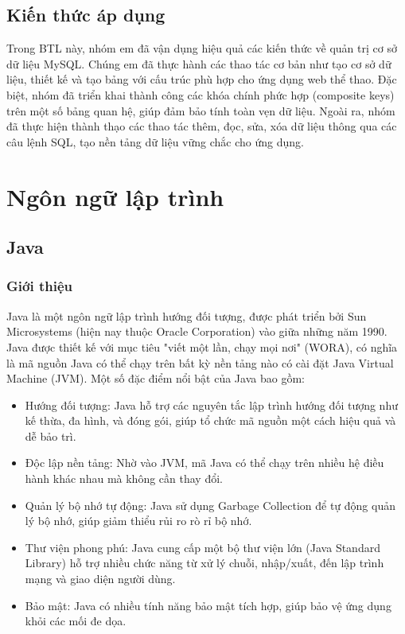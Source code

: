 \documentclass[../BTL.tex]{subfiles}
\begin{document}
\subsection{ Kiến thức áp dụng}
Trong BTL này, nhóm em đã vận dụng hiệu quả các kiến thức về quản trị cơ sở dữ liệu MySQL. Chúng em đã thực hành các thao tác cơ bản như tạo cơ sở dữ liệu, thiết kế và tạo bảng với cấu trúc phù hợp cho ứng dụng web thể thao. Đặc biệt, nhóm đã triển khai thành công các khóa chính phức hợp (composite keys) trên một số bảng quan hệ, giúp đảm bảo tính toàn vẹn dữ liệu. Ngoài ra, nhóm đã thực hiện thành thạo các thao tác thêm, đọc, sửa, xóa dữ liệu thông qua các câu lệnh SQL, tạo nền tảng dữ liệu vững chắc cho ứng dụng.
\section{Ngôn ngữ lập trình}
\subsection{Java}
\subsubsection{Giới thiệu}
Java là một ngôn ngữ lập trình hướng đối tượng, được phát triển bởi Sun Microsystems (hiện nay thuộc Oracle Corporation) vào giữa những năm 1990. Java được thiết kế với mục tiêu "viết một lần, chạy mọi nơi" (WORA), có nghĩa là mã nguồn Java có thể chạy trên bất kỳ nền tảng nào có cài đặt Java Virtual Machine (JVM). Một số đặc điểm nổi bật của Java bao gồm:

\begin{itemize}
    \item Hướng đối tượng: Java hỗ trợ các nguyên tắc lập trình hướng đối tượng như kế thừa, đa hình, và đóng gói, giúp tổ chức mã nguồn một cách hiệu quả và dễ bảo trì.
    \item Độc lập nền tảng: Nhờ vào JVM, mã Java có thể chạy trên nhiều hệ điều hành khác nhau mà không cần thay đổi.
    \item Quản lý bộ nhớ tự động: Java sử dụng Garbage Collection để tự động quản lý bộ nhớ, giúp giảm thiểu rủi ro rò rỉ bộ nhớ.
    \item Thư viện phong phú: Java cung cấp một bộ thư viện lớn (Java Standard Library) hỗ trợ nhiều chức năng từ xử lý chuỗi, nhập/xuất, đến lập trình mạng và giao diện người dùng.
    \item Bảo mật: Java có nhiều tính năng bảo mật tích hợp, giúp bảo vệ ứng dụng khỏi các mối đe dọa.
\end{itemize}
\end{document}
